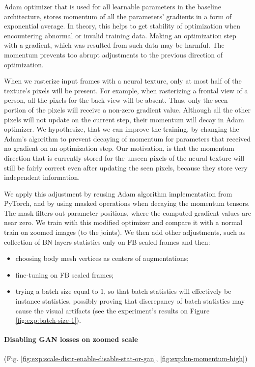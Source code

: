 Adam \cite{dnn:adam14} optimizer that is used for all learnable parameters in the baseline architecture, stores momentum of all the parameters' gradients in a form of exponential average. In theory, this helps to get stability of optimization when encountering abnormal or invalid training data. Making an optimization step with a gradient, which was resulted from such data may be harmful. The momentum prevents too abrupt adjustments to the previous direction of optimization. 

When we rasterize input frames with a neural texture, only at most half of the texture's pixels will be present. For example, when rasterizing a frontal view of a person, all the pixels for the back view will be absent. Thus, only the seen portion of the pixels will receive a non-zero gradient value. Although all the other pixels will not update on the current step, their momentum will decay in Adam optimizer. We hypothesize, that we can improve the training, by changing the Adam's algorithm to prevent decaying of momentum for parameters that received no gradient on an optimization step. Our motivation, is that the momentum direction that is currently stored for the unseen pixels of the neural texture will still be fairly correct even after updating the seen pixels, because they store very independent information.

We apply this adjustment by reusing Adam algorithm implementation from PyTorch, and by using masked operations when decaying the momentum tensors. The mask filters out parameter positions, where the computed gradient values are near zero. We train with this modified optimizer and compare it with a normal train on zoomed images (to the joints). We then add other adjustments, such as collection of BN layers statistics only on FB scaled frames and then:
\begin{itemize}
	\item choosing body mesh vertices as centers of augmentations;
	\item fine-tuning on FB scaled frames;
	\item trying a batch size equal to 1, so that batch statistics will effectively be instance statistics, possibly proving that discrepancy of batch statistics may cause the visual artifacts (see the experiment's results on Figure \ref{fig:exp:batch-size-1}).
\end{itemize}

\vspace{-15pt}\paragraph{Disabling GAN losses on zoomed scale}(Fig. \ref{fig:exp:scale-distr-enable-disable-stat-or-gan}, \ref{fig:exp:bn-momentum-high})\mbox{}\nopagebreak

